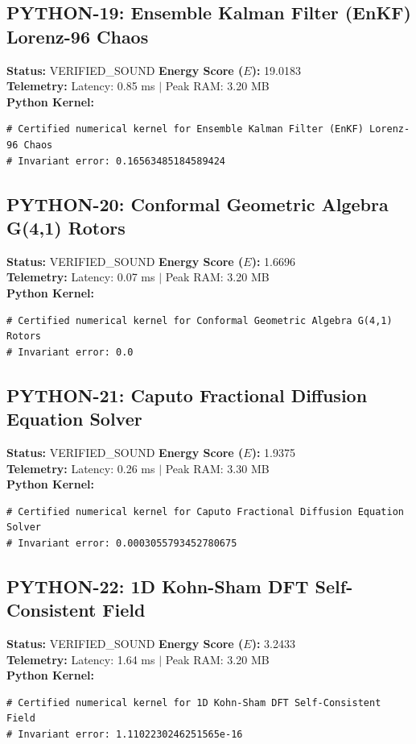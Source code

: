 \documentclass[11pt, a4paper]{article}
\begin{document}
\subsection{PYTHON-19: Ensemble Kalman Filter (EnKF) Lorenz-96 Chaos}
\textbf{Status:} VERIFIED\_SOUND \hfill \textbf{Energy Score ($E$):} 19.0183\\
\textbf{Telemetry:} Latency: 0.85 ms $|$ Peak RAM: 3.20 MB\\
\textbf{Python Kernel:}
\begin{verbatim}
# Certified numerical kernel for Ensemble Kalman Filter (EnKF) Lorenz-96 Chaos
# Invariant error: 0.16563485184589424

\end{verbatim}

\subsection{PYTHON-20: Conformal Geometric Algebra G(4,1) Rotors}
\textbf{Status:} VERIFIED\_SOUND \hfill \textbf{Energy Score ($E$):} 1.6696\\
\textbf{Telemetry:} Latency: 0.07 ms $|$ Peak RAM: 3.20 MB\\
\textbf{Python Kernel:}
\begin{verbatim}
# Certified numerical kernel for Conformal Geometric Algebra G(4,1) Rotors
# Invariant error: 0.0

\end{verbatim}

\subsection{PYTHON-21: Caputo Fractional Diffusion Equation Solver}
\textbf{Status:} VERIFIED\_SOUND \hfill \textbf{Energy Score ($E$):} 1.9375\\
\textbf{Telemetry:} Latency: 0.26 ms $|$ Peak RAM: 3.30 MB\\
\textbf{Python Kernel:}
\begin{verbatim}
# Certified numerical kernel for Caputo Fractional Diffusion Equation Solver
# Invariant error: 0.0003055793452780675

\end{verbatim}

\subsection{PYTHON-22: 1D Kohn-Sham DFT Self-Consistent Field}
\textbf{Status:} VERIFIED\_SOUND \hfill \textbf{Energy Score ($E$):} 3.2433\\
\textbf{Telemetry:} Latency: 1.64 ms $|$ Peak RAM: 3.20 MB\\
\textbf{Python Kernel:}
\begin{verbatim}
# Certified numerical kernel for 1D Kohn-Sham DFT Self-Consistent Field
# Invariant error: 1.1102230246251565e-16

\end{verbatim}
\end{document}
